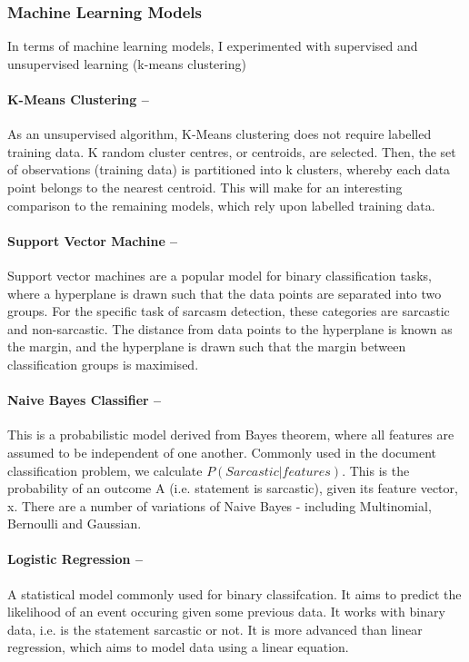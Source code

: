 \documentclass[12pt,a4paper]{article}
\begin{document}
\subsubsection{Machine Learning Models}
In terms of machine learning models, I experimented with supervised and unsupervised learning (k-means clustering)

\paragraph{K-Means Clustering --}
As an unsupervised algorithm, K-Means clustering does not require labelled training data. K random cluster centres, or centroids, are selected. Then, the set of observations (training data) is partitioned into k clusters, whereby each data point belongs to the nearest centroid. This will make for an interesting comparison to the remaining models, which rely upon labelled training data.

\paragraph{Support Vector Machine --}
Support vector machines are a popular model for binary classification tasks, where a hyperplane is drawn such that the data points are separated into two groups. For the specific task of sarcasm detection, these categories are sarcastic and non-sarcastic. The distance from data points to the hyperplane is known as the margin, and  the hyperplane is drawn such that the margin between classification groups is maximised.


\paragraph{Naive Bayes Classifier --} This is a probabilistic model derived from Bayes theorem, where all features are assumed to be independent of one another. Commonly used in the document classification problem, we calculate ${P(Sarcastic | features)}$. This is  the probability of an outcome A (i.e. statement is sarcastic), given its feature vector, x. There are a number of variations of Naive Bayes - including Multinomial, Bernoulli and Gaussian. 

\paragraph{Logistic Regression --} A statistical model commonly used for binary classifcation. It aims to predict the likelihood of an event occuring given some previous data. It works with binary data, i.e. is the statement sarcastic or not. It is more advanced than linear regression, which aims to model data using a linear equation.
\end{document}

